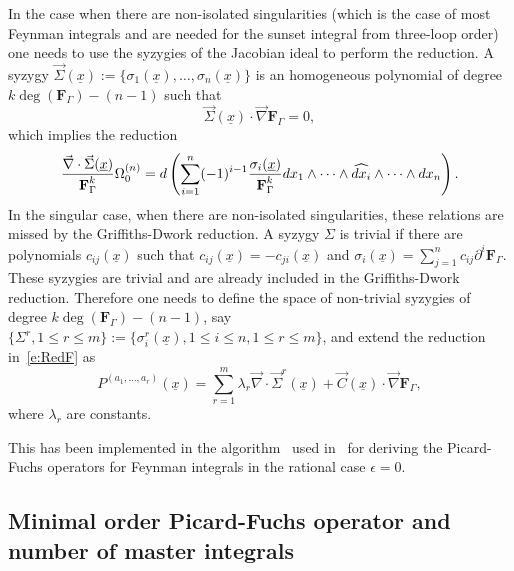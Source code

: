 \documentclass[a4paper,12pt]{article}
\numberwithin{equation}{section}
\numberwithin{figure}{section}
\begin{document}
In the case when there are non-isolated singularities (which is the
case of most Feynman integrals and are needed for the sunset
integral from three-loop order) one needs to use
the syzygies of the Jacobian ideal to perform the
reduction.
A syzygy  $\vec\Sigma(\underline x):=\{\sigma_1(\underline x),\dots,\sigma_n(\underline x)\}$ is an homogeneous polynomial of
degree $k \deg(\textbf{F}_\Gamma)-(n-1)$ such that
\begin{equation}
	\vec \Sigma(\underline x) \cdot \vec\nabla  \textbf{F}_\Gamma=0,
\end{equation}
%
which implies the reduction
\begin{equation}
	{ \vec \nabla\cdot \vec\Sigma(\underline x) \over \textbf{F}_\Gamma^k
	}\Omega_0^{(n)}=d\left(\sum_{i=1}^n (-1)^{i-1} {\sigma_i(\underline x)\over
		\textbf{F}_\Gamma^k} dx_1\wedge \cdots \wedge
	\widehat{dx_i}\wedge \cdots \wedge dx_n\right).
\end{equation}
In the singular case, when there are non-isolated singularities, these
relations are missed by the Griffiths-Dwork reduction.
A syzygy $\Sigma$ is trivial if there are polynomials
$c_{ij}(\underline x)$ such that $c_{ij}(\underline
x)=-c_{ji}(\underline x)$ and  $\sigma_i(\underline x)= \sum_{j=1}^n
c_{ij} \partial^i \textbf{F}_\Gamma$.  These syzygies are trivial and
are already included in the Griffiths-Dwork reduction.
Therefore one needs to define the space of non-trivial syzygies of
degree $k \deg(\textbf{F}_\Gamma)-(n-1)$, say $\{\Sigma^r,1\leq r\leq m\}:=\{\sigma_i^r(\underline
x),  1\leq i\leq n,  1\leq r\leq m\}$, and extend the reduction
in~\eqref{e:RedF} as 
\begin{equation}\label{e:GDsyz}
	P^{(a_1,\dots,a_r)}(\underline x)=   \sum_{r=1}^m
	\lambda_r\vec\nabla\cdot \vec \Sigma^r(\underline x)+
	\vec C(\underline
	x)\cdot \vec \nabla \textbf{F}_\Gamma ,
\end{equation}
where $\lambda_r$ are constants.

This has been implemented in the algorithm~\cite{lairez2016computing}
used in~\cite{Lairez:2022zkj} for deriving the Picard-Fuchs operators for
Feynman integrals in the rational case $\epsilon=0$.



\subsection{Minimal order Picard-Fuchs operator and number of master integrals}
\end{document}
